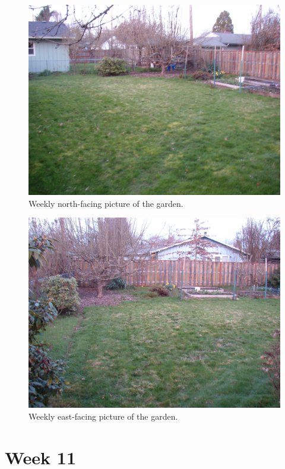 \documentclass{article}
\begin{document}
\begin{figure}
\protect \includegraphics[scale=0.20]{pics/0315_garden1.jpg}
\caption{Weekly north-facing picture of the garden.}
\end{figure}
\begin{figure}
\protect \includegraphics[scale=0.20]{pics/0315_garden2.jpg}
\caption{Weekly east-facing picture of the garden.}
\end{figure}

\clearpage

\section*{Week 11}
\end{document}
